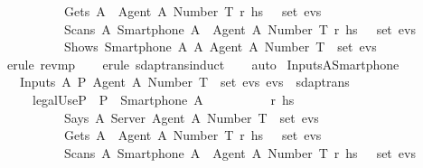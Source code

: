 \begin{isabellebody}
  \ \ \ \ \ \ \ \ \ \ Gets\ A\ {\isasymlbrace}\ {\isasymlbrace}Agent\ A{\isacharcomma}\ Number\ T{\isasymrbrace}{\isacharcomma}\ r{\isacharprime}{\isacharcomma}\ h\isactrlsub s\ {\isasymrbrace}\ {\isasymin}\ set\ evs\ {\isasymand}\isanewline
  \ \ \ \ \ \ \ \ \ \ Scans\ A\ {\isacharparenleft}Smartphone\ A{\isacharparenright}\ {\isasymlbrace}\ {\isasymlbrace}Agent\ A{\isacharcomma}\ Number\ T{\isasymrbrace}{\isacharcomma}\ r{\isacharprime}{\isacharcomma}\ h\isactrlsub s\ {\isasymrbrace}\ {\isasymin}\ set\ evs\ {\isasymand}\isanewline
  \ \ \ \ \ \ \ \ \ \ Shows\ {\isacharparenleft}Smartphone\ A{\isacharparenright}\ A\ {\isasymlbrace}Agent\ A{\isacharcomma}\ Number\ T{\isasymrbrace}\ {\isasymin}\ set\ evs{\isacharparenright}{\isachardoublequoteclose}\isanewline
  \isadelimproof
  \isanewline
  \ \ %
  \endisadelimproof
  \isatagproof
  \isamarkupfalse%
  \ {\isacharparenleft}erule\ rev{\isacharunderscore}mp{\isacharparenright}\isanewline
  \ \ \isamarkupfalse%
  \ {\isacharparenleft}erule\ sdaptrans{\isachardot}induct{\isacharparenright}\isanewline
  \ \ \isamarkupfalse%
  \ {\isacharparenleft}auto{\isacharparenright}\isanewline
  \isamarkupfalse%
  \endisatagproof
  {\isafoldproof}%
  \isadelimproof
  \isanewline
  \endisadelimproof
  \isanewline
  \isamarkupfalse%
  \ Inputs{\isacharunderscore}A{\isacharunderscore}Smartphone{\isacharunderscore}{}\ {\isacharcolon}\ \isanewline
  \ \ {\isachardoublequoteopen}{\isasymlbrakk}\ Inputs\ A\ P\ {\isasymlbrace}Agent\ A{\isacharcomma}\ Number\ T{\isasymrbrace}\ {\isasymin}\ set\ evs{\isacharsemicolon}\ evs\ {\isasymin}\ sdaptrans\ {\isasymrbrakk}\isanewline
  \ \ \ \ {\isasymLongrightarrow}\ {\isacharparenleft}legalUse{\isacharparenleft}P{\isacharparenright}{\isacharparenright}\ {\isasymand}\ P\ {\isacharequal}\ {\isacharparenleft}Smartphone\ A{\isacharparenright}\ {\isasymand}\isanewline
  \ \ \ \ \ \ \ \ {\isacharparenleft}{\isasymexists}\ r{\isacharprime}\ h\isactrlsub s{\isachardot}\isanewline
  \ \ \ \ \ \ \ \ \ \ Says\ A\ Server\ {\isasymlbrace}Agent\ A{\isacharcomma}\ Number\ T{\isasymrbrace}\ {\isasymin}\ set\ evs\ {\isasymand}\isanewline
  \ \ \ \ \ \ \ \ \ \ Gets\ A\ {\isasymlbrace}\ {\isasymlbrace}Agent\ A{\isacharcomma}\ Number\ T{\isasymrbrace}{\isacharcomma}\ r{\isacharprime}{\isacharcomma}\ h\isactrlsub s\ {\isasymrbrace}\ {\isasymin}\ set\ evs\ {\isasymand}\isanewline
  \ \ \ \ \ \ \ \ \ \ Scans\ A\ {\isacharparenleft}Smartphone\ A{\isacharparenright}\ {\isasymlbrace}\ {\isasymlbrace}Agent\ A{\isacharcomma}\ Number\ T{\isasymrbrace}{\isacharcomma}\ r{\isacharprime}{\isacharcomma}\ h\isactrlsub s\ {\isasymrbrace}\ {\isasymin}\ set\ evs\ {\isasymand}\isanewline

\end{isabellebody}
